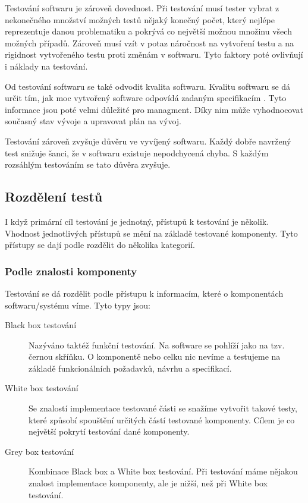 Testování softwaru je zároveň dovednost. Při testování musí tester vybrat z nekonečného množství možných testů nějaký konečný počet, který nejlépe reprezentuje danou problematiku a pokrývá co největší možnou množinu všech možných případů. Zároveň musí vzít v potaz náročnost na vytvoření testu a na rigidnost vytvořeného testu proti změnám v softwaru. Tyto faktory poté ovlivňují i náklady na testování. \cite{fewster1999software}

Od testování softwaru se také odvodit kvalita softwaru. Kvalitu softwaru se dá určit tím, jak moc vytvořený software odpovídá zadaným specifikacím \cite{software_quality}. Tyto informace jsou poté velmi důležité pro managment. Díky nim může vyhodnocovat současný stav vývoje a upravovat plán na vývoj. 

Testování zároveň zvyšuje důvěru ve vyvíjený softwaru. Každý dobře navržený test snižuje šanci, že v softwaru existuje nepodchycená chyba. S každým rozsáhlým testováním se tato důvěra zvyšuje. \cite{fewster1999software}



\subsection{Rozdělení testů}

I když primární cíl testování je jednotný, přístupů k testování je několik. Vhodnost jednotlivých přístupů se mění na základě testované komponenty. Tyto přístupy se dají podle \cite{luo2001software} rozdělit do několika kategorií.

\subsubsection{Podle znalosti komponenty}

Testování se dá rozdělit podle přístupu k informacím, které o komponentách softwaru/systému víme. Tyto typy jsou:

\begin{description}
    \item[Black box testování] Nazýváno taktéž funkční testování. Na software se pohlíží jako na tzv. černou skříňku. O komponentě nebo celku nic nevíme a testujeme na základě funkcionálních požadavků, návrhu a specifikací. 
    \item[White box testování] Se znalostí implementace testované části se snažíme vytvořit takové testy, které způsobí spouštění určitých částí testované komponenty. Cílem je co největší pokrytí testování dané komponenty.
    \item[Grey box testování] Kombinace Black box a White box testování. Při testování máme nějakou znalost implementace komponenty, ale je nižší, než při White box testování. \cite{khan2010different}
\end{description}

